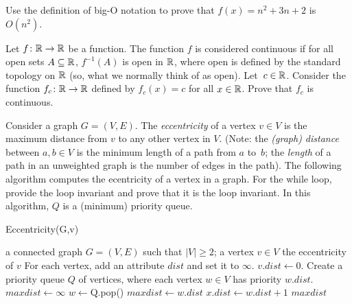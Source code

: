 \documentclass{article}
\begin{document}
\nextprob{}
Use the definition of big-O notation to prove that $f(x)=n^2 + 3n +2$ is
$O(n^2)$.

\nextprob{}
Let $f \colon {\mathbb R} \to {\mathbb R}$ be a function.
The function $f$ is considered continuous if for all open sets $A \subseteq {\mathbb R}$,
$f^{-1}(A)$ is open in ${\mathbb R}$, where open is defined by the standard topology on
${\mathbb R}$ (so, what we normally think of as open).  Let~$c \in {\mathbb R}$.  Consider the
function $f_c \colon {\mathbb R} \to {\mathbb R}$ defined by $f_c(x) = c$ for all $x \in {\mathbb R}$. Prove
that $f_c$ is continuous.

\nextprob{}

Consider a graph $G=(V,E)$. The \emph{eccentricity} of a vertex $v \in V$ is the
maximum distance from $v$ to any other vertex in $V$. (Note: the \emph{(graph) distance} between
$a,b\in V$ is the minimum length of a path from $a$ to~$b$; the \emph{length} of
a path in an unweighted graph is the number of edges in the path). The
following algorithm computes the ecentricity of a vertex in a graph.  For the
while loop, provide the loop invariant and prove that it is the loop invariant.
In this algorithm, $Q$ is a (minimum) priority queue.

\begin{algorithm}
    \caption{Eccentricity(G,v)}
    \begin{algorithmic}[1]
        \REQUIRE a connected graph $G=(V,E)$ such that $|V| \geq 2$; a vertex $v \in V$
        \ENSURE the eccentricity of $v$
        \STATE For each vertex, add an attribute $dist$ and set it to $\infty$.
        \STATE $v.dist \gets 0$.
        \STATE Create a priority queue $Q$ of vertices, where each
                vertex $w\in V$ has priority $w.dist$.
        \STATE $maxdist \gets \infty$
            \STATE $w \gets $Q.pop() 
            \STATE $maxdist \gets w.dist$
                \STATE $x.dist \gets w.dist +1$
            \ENDFOR
        \ENDWHILE
        \RETURN $maxdist$
    \end{algorithmic}
\end{algorithm}
\end{document}
